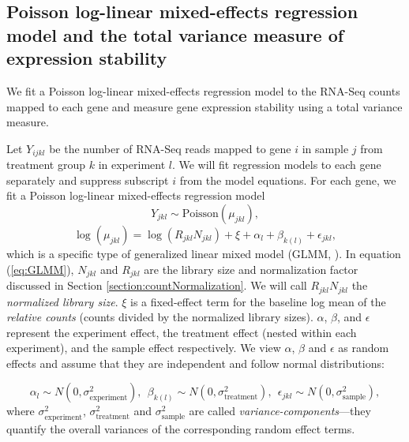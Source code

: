 \documentclass[letterpaper,12pt]{article}
\begin{document}

\subsection{Poisson log-linear mixed-effects regression model and the total
variance measure of expression stability}\label{subsection:OurMethod} 
We fit a Poisson log-linear mixed-effects regression model to the
RNA-Seq counts mapped to each gene and measure gene expression stability using
a total variance measure.

Let $Y_{ijkl}$ be the number of RNA-Seq reads mapped to gene
$i$ in sample $j$ from treatment group $k$  in experiment $l$. We will fit
regression models to each gene separately and suppress subscript $i$ from the
model equations.  For each gene, we fit a Poisson log-linear mixed-effects regression model 
\begin{equation}
  Y_{jkl} \sim \text{Poisson}(\mu_{jkl}),
\end{equation}
\begin{equation}\label{eq:GLMM}
	  \log( \mu_{jkl}) = \log(R_{jkl}N_{jkl})+ \xi + \alpha_l + \beta_{k(l)} + \epsilon_{jkl},
\end{equation}
which is a specific type of generalized linear mixed model (GLMM, \citet{mcculloch2001generalized}). 
In equation (\ref{eq:GLMM}), $N_{jkl}$ and $R_{jkl}$ are the library size and normalization factor discussed in
Section \ref{section:countNormalization}. We will call $R_{jkl}N_{jkl}$ 
the \textit{normalized library size}.
$\xi$ is a fixed-effect term for the baseline log mean of the {\em relative
counts} (counts divided by the normalized library sizes). 
$\alpha$, $\beta$, and $\epsilon$ %
represent the experiment effect, the treatment effect (nested within each
experiment), and the sample effect respectively. 
We view  $\alpha$, $\beta$ and $\epsilon$ as random effects and assume that
they are independent and follow normal distributions:

\begin{equation}\label{eq:normalassumption}
  \alpha_l\sim N(0, \sigma^2_{\text{experiment}}),~~
  \beta_{k(l)}\sim N(0, \sigma^2_{\text{treatment}}),~~
  \epsilon_{jkl}\sim N(0, \sigma_{\text{sample}}^2),
\end{equation}
where $\sigma_{\text{experiment}}^2$, $\sigma_{\text{treatment}}^2$ and
$\sigma_{\text{sample}}^2$ are called \textit{variance-components}---they
quantify the overall variances of the corresponding random effect terms. 
\end{document}
